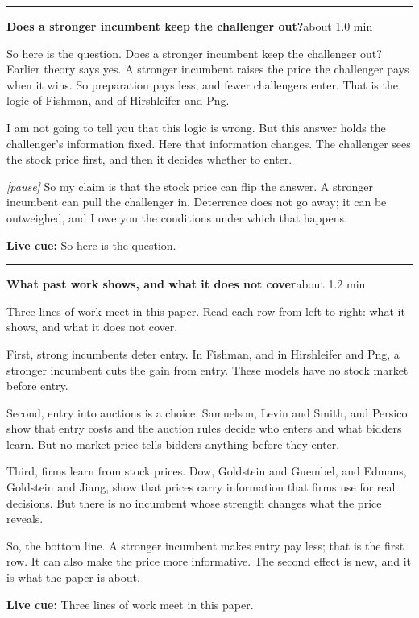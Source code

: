 \documentclass[11pt]{article}
\newcommand{\Pause}{\textcolor{ScriptGray}{\textit{[pause]}}}
\newcommand{\Cue}[1]{\par\nobreak\smallskip\noindent
  \textcolor{ScriptGray}{\footnotesize\textbf{Live cue:} #1}\par}
\newcommand{\scriptframe}[3]{%
  \Needspace{9\baselineskip}%
  \par\medskip\noindent\textcolor{ScriptBlue}{\rule{\linewidth}{0.55pt}}%
  \par\smallskip\noindent
  \textbf{#1}\hfill\textcolor{ScriptGray}{\small #2}\par\smallskip
  #3\par}
\begin{document}
\scriptframe{Does a stronger incumbent keep the challenger out?}{about 1.0 min}{%
  So here is the question. Does a stronger incumbent keep the challenger out?
  Earlier theory says yes. A stronger incumbent raises the price the
  challenger pays when it wins. So preparation pays less, and fewer challengers
  enter. That is the logic of Fishman, and of Hirshleifer and Png.

  I am not going to tell you that this logic is wrong. But this answer holds
  the challenger's information fixed. Here that information changes. The
  challenger sees the stock price first, and then it decides whether to enter.

  \Pause{} So my claim is that the stock price can flip the answer. A stronger
  incumbent can pull the challenger in. Deterrence does not go away; it can be
  outweighed, and I owe you the conditions under which that happens.
  \Cue{So here is the question.}
}

\scriptframe{What past work shows, and what it does not cover}{about 1.2 min}{%
  Three lines of work meet in this paper. Read each row from left to right:
  what it shows, and what it does not cover.

  First, strong incumbents deter entry. In Fishman, and in Hirshleifer and Png,
  a stronger incumbent cuts the gain from entry. These models have no stock
  market before entry.

  Second, entry into auctions is a choice. Samuelson, Levin and Smith, and
  Persico show that entry costs and the auction rules decide who enters and
  what bidders learn. But no market price tells bidders anything before they
  enter.

  Third, firms learn from stock prices. Dow, Goldstein and Guembel, and Edmans,
  Goldstein and Jiang, show that prices carry information that firms use for
  real decisions. But there is no incumbent whose strength changes what the
  price reveals.

  So, the bottom line. A stronger incumbent makes entry pay less; that is the
  first row. It can also make the price more informative. The second effect is
  new, and it is what the paper is about.
  \Cue{Three lines of work meet in this paper.}
}
\end{document}
